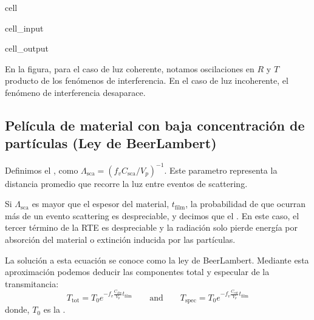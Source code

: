 \documentclass[letterpaper,10pt,english]{jupyterBook}
\begin{document}
\begin{sphinxuseclass}{cell}
\begin{sphinxVerbatimInput}
\begin{sphinxuseclass}{cell_input}
\end{sphinxuseclass}\end{sphinxVerbatimInput}
\begin{sphinxVerbatimOutput}

\begin{sphinxuseclass}{cell_output}
\noindent{}

\end{sphinxuseclass}\end{sphinxVerbatimOutput}

\end{sphinxuseclass}
\sphinxAtStartPar
En la figura, para el caso de luz coherente, notamos oscilaciones en \(R\) y \(T\) producto de los fenómenos de interferencia. En el caso de luz incoherente, el fenómeno de interferencia desaparace.


\subsection{Película de material con baja concentración de partículas (Ley de Beer\sphinxhyphen{}Lambert)}
\label{\detokenize{5_TransporteRadiativo/5_TransporteRadiativo:pelicula-de-material-con-baja-concentracion-de-particulas-ley-de-beer-lambert}}
\sphinxAtStartPar
Definimos el , como \(\Lambda_\mathrm{sca} = \left(f_v C_\mathrm{sca}/V_p\right)^{-1}\). Este parametro representa la distancia promedio que recorre la luz entre eventos de scattering.

\sphinxAtStartPar
Si \(\Lambda_\mathrm{sca}\) es mayor que el espesor del material, \(t_\mathrm{film}\), la probabilidad de que ocurran más de un evento scattering es despreciable, y decimos que el . En este caso, el tercer término de la RTE es despreciable y la radiación solo pierde energía por absorción del material o extinción inducida por las partículas.

\sphinxAtStartPar
La solución a esta ecuación se conoce como la ley de Beer\sphinxhyphen{}Lambert. Mediante esta aproximación podemos deducir las componentes total y especular de la transmitancia:
\label{equation:5_TransporteRadiativo/5_TransporteRadiativo:8023a28d-9cc5-4e13-a69b-6171fe305c03}\begin{equation}
T_\mathrm{tot} = T_0 e^{-f_v\frac{C_\mathrm{abs}}{V_p}t_\mathrm{film}}\quad\quad\mathrm{and}\quad\quad 
T_\mathrm{spec} = T_0 e^{-f_v\frac{C_\mathrm{ext}}{V_p}t_\mathrm{film}}
\end{equation}
\sphinxAtStartPar
donde, \(T_0\) es la .
\end{document}
